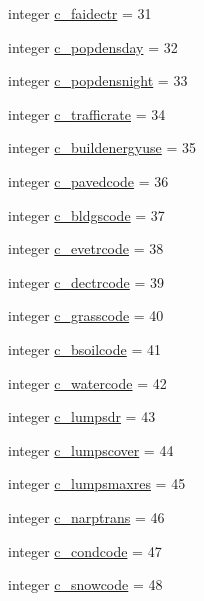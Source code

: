 \begin{DoxyCompactItemize}
integer \hyperlink{namespacecolnamesinputfiles_aa3d9641334a3ef6ad84b50559eb8b91c}{c\+\_\+faidectr} = 31
\item 
integer \hyperlink{namespacecolnamesinputfiles_a7c717cd50c52eddd44eac4a880ba08c1}{c\+\_\+popdensday} = 32
\item 
integer \hyperlink{namespacecolnamesinputfiles_a3f73646adefaa458f5320fb1cb3808d6}{c\+\_\+popdensnight} = 33
\item 
integer \hyperlink{namespacecolnamesinputfiles_a1313118ff1eaf23efd4bd5404c07ca1b}{c\+\_\+trafficrate} = 34
\item 
integer \hyperlink{namespacecolnamesinputfiles_a811f7d78ee35342f1708073383f4da17}{c\+\_\+buildenergyuse} = 35
\item 
integer \hyperlink{namespacecolnamesinputfiles_aa6cbac2a118fa736e41076c46c1e9a78}{c\+\_\+pavedcode} = 36
\item 
integer \hyperlink{namespacecolnamesinputfiles_a0155665a9c028c6e9ed4d42703f96b7e}{c\+\_\+bldgscode} = 37
\item 
integer \hyperlink{namespacecolnamesinputfiles_ab5729e8368a3611c6361ecd0a74b0e27}{c\+\_\+evetrcode} = 38
\item 
integer \hyperlink{namespacecolnamesinputfiles_a2ad32fd4b205fb9b641e07196a382951}{c\+\_\+dectrcode} = 39
\item 
integer \hyperlink{namespacecolnamesinputfiles_a4be2d6d7d3ca63a7e9edbd87dbc5cb6a}{c\+\_\+grasscode} = 40
\item 
integer \hyperlink{namespacecolnamesinputfiles_ab3c7d949c11126cfbb605bb3fbeeffea}{c\+\_\+bsoilcode} = 41
\item 
integer \hyperlink{namespacecolnamesinputfiles_a38ff6513e7e6bb0b350213936967f86a}{c\+\_\+watercode} = 42
\item 
integer \hyperlink{namespacecolnamesinputfiles_a93d199d7ce0bbedc87456becfe2dd3c4}{c\+\_\+lumpsdr} = 43
\item 
integer \hyperlink{namespacecolnamesinputfiles_a639190b378d3266fe7f888278247d979}{c\+\_\+lumpscover} = 44
\item 
integer \hyperlink{namespacecolnamesinputfiles_ad466968b4cdd794a5eb6b62e072bcbdb}{c\+\_\+lumpsmaxres} = 45
\item 
integer \hyperlink{namespacecolnamesinputfiles_a2f7a919691e19ab3b4530964bb7d59ba}{c\+\_\+narptrans} = 46
\item 
integer \hyperlink{namespacecolnamesinputfiles_aeade668094b48396c577d712f18cddef}{c\+\_\+condcode} = 47
\item 
integer \hyperlink{namespacecolnamesinputfiles_abf3957da7f8fa068b2bff815f8e9b7aa}{c\+\_\+snowcode} = 48

\end{DoxyCompactItemize}
